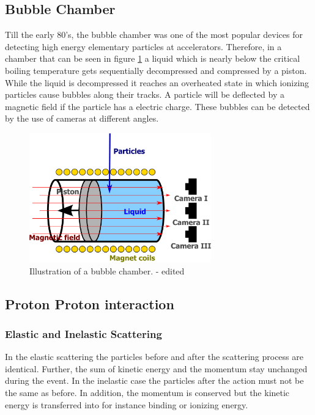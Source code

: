 \documentclass[10pt, a4paper, notitlepage, DIV=15]{scrartcl}
\begin{document}
\subsection{Bubble Chamber}
Till the early 80's, the bubble chamber was one of the most popular devices for detecting high energy elementary particles at accelerators. Therefore, in  a chamber that can be seen in figure \ref*{fig:bubble-chamber} a liquid which is nearly below the critical boiling temperature gets sequentially decompressed and compressed by a piston. While the liquid is decompressed it reaches an overheated state in which ionizing particles cause bubbles along their tracks. A particle will be deflected by a magnetic field if the particle has a electric charge. These bubbles can be detected by the use of cameras at different angles.   
\begin{figure}[h]
	\centering
	\includegraphics[width=0.7\textwidth]{bubble-chamber}
	\caption{Illustration of a bubble chamber. \cite{wiki-bubble} - edited}
	\label{fig:bubble-chamber}
\end{figure}
\FloatBarrier
\subsection{Proton Proton interaction}
\subsubsection{Elastic and Inelastic Scattering}
In the elastic scattering the particles before and after the scattering process are identical. Further, the sum of kinetic energy and the momentum stay unchanged during the event. In the inelastic case the particles after the action must not be the same as before. In addition, the momentum is conserved but the kinetic energy is transferred into for instance binding or ionizing energy. \cite{povh}
\end{document}
